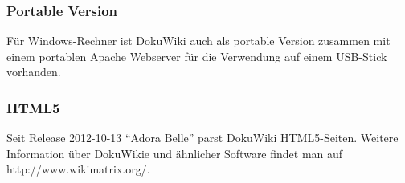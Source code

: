 \documentclass{article}
\begin{document}
\subsubsection{Portable Version}
Für Windows-Rechner ist DokuWiki auch als portable Version zusammen mit einem portablen Apache Webserver für die Verwendung auf einem USB-Stick vorhanden.
\subsubsection{HTML5}
Seit Release 2012-10-13 ``Adora Belle'' parst DokuWiki HTML5-Seiten. 
\linebreak\linebreak 
Weitere Information über DokuWikie und \"ahnlicher Software findet man auf http://www.wikimatrix.org/.
\end{document}

